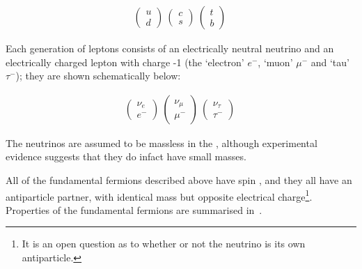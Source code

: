 \begin{align}
\left( \begin{array}{c} u \\ d \end{array} \right) \ 
\left( \begin{array}{c} c \\ s \end{array} \right) \ 
\left( \begin{array}{c} t \\ b \end{array} \right) \ 
\end{align}

Each generation of leptons consists of an electrically neutral neutrino
and an electrically charged lepton with charge -1 (the `electron' $e^{-}$, `muon' $\mu^{-}$ and
`tau' $\tau^{-}$); they are shown schematically below:

\begin{align}
\left( \begin{array}{c} \nu_{e} \\ e^{-} \end{array} \right) \ 
\left( \begin{array}{c} \nu_{\mu} \\ \mu^{-} \end{array} \right) \ 
\left( \begin{array}{c} \nu_{\tau} \\ \tau^{-} \end{array} \right) \ 
\end{align} 

The neutrinos are assumed to be massless in the \sm, although experimental
evidence suggests that they do infact have small masses.

All of the fundamental fermions described above have spin , and they all have an antiparticle partner, with
identical mass but opposite electrical charge\footnote{It is an open question
as to whether or not the neutrino is its own antiparticle.}.
Properties of the fundamental fermions are summarised in~.

